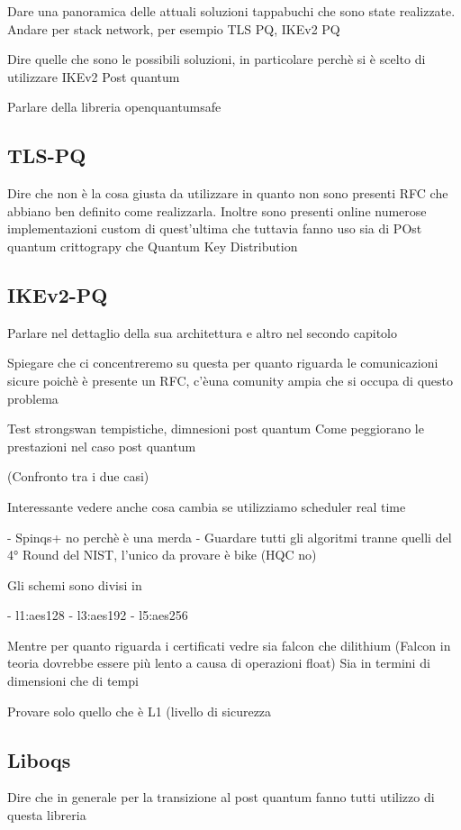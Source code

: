 Dare una panoramica delle attuali soluzioni tappabuchi che sono state
realizzate. Andare per stack network, per esempio TLS PQ, IKEv2 PQ

Dire quelle che sono le possibili soluzioni, in particolare perchè si è scelto
di utilizzare IKEv2 Post quantum

Parlare della libreria openquantumsafe

\subsection{TLS-PQ}

Dire che non è la cosa giusta da utilizzare in quanto non sono presenti RFC che
abbiano ben definito come realizzarla. Inoltre sono presenti online numerose
implementazioni custom di quest'ultima che tuttavia fanno uso sia di POst
quantum crittograpy che Quantum Key Distribution

\subsection{IKEv2-PQ}

Parlare nel dettaglio della sua architettura e altro nel secondo capitolo

Spiegare che ci concentreremo su questa per quanto riguarda le comunicazioni
sicure poichè è presente un RFC, c'èuna comunity ampia che si occupa di questo
problema


Test strongswan tempistiche, dimnesioni post quantum
Come peggiorano le prestazioni nel caso post quantum 

(Confronto tra i due casi)

Interessante vedere anche cosa cambia se utilizziamo scheduler real time

- Spinqs+ no perchè è una merda
- Guardare tutti gli algoritmi tranne quelli del 4° Round del NIST, l'unico da
provare è bike (HQC no)


Gli schemi sono divisi in 

- l1:aes128
- l3:aes192
- l5:aes256

Mentre per quanto riguarda i certificati vedre sia falcon che dilithium
(Falcon in teoria dovrebbe essere più lento a causa di operazioni float)
Sia in termini di dimensioni che di tempi



Provare solo quello che è L1 (livello di sicurezza 


\subsection{Liboqs}

Dire che in generale per la transizione al post quantum fanno tutti utilizzo di
questa libreria

